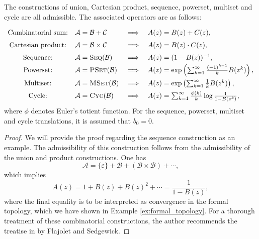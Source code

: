 \begin{theorem}\label{thm:symbolic_method}
  The constructions of union, Cartesian product, sequence, powerset, multiset and cycle are all admissible. The associated operators are as follows:
  \begin{equation*}
    \def\arraystretch{1.5}
    \begin{array}{cllll}
      \text{Combinatorial sum:} & \mathcal{A} = \mathcal{B} + \mathcal{C} & \implies & A(z) = B(z) + C(z), \\
      \text{Cartesian product:} & \mathcal{A} = \mathcal{B} \times \mathcal{C} & \implies & A(z) = B(z) \cdot C(z), \\
      \text{Sequence:} & \mathcal{A} = \textsc{Seq}(\mathcal{B}) & \implies & A(z) = (1 - B(z))^{-1}, \\
      \text{Powerset:} & \mathcal{A} = \textsc{PSet}(\mathcal{B}) & \implies & A(z) = \exp\left(\sum_{k=1}^\infty \frac{(-1)^{k-1}}{k}B(z^k)\right), \\
      \text{Multiset:} & \mathcal{A} = \textsc{MSet}(\mathcal{B}) & \implies & A(z) = \exp\left(\sum_{k=1}^\infty \frac{1}{k} B(z^k)\right), \\
      \text{Cycle:} & \mathcal{A} = \textsc{Cyc}(\mathcal{B}) & \implies & A(z) = \sum_{k=1}^\infty \frac{\phi(k)}{k} \log \frac{1}{1 - B(z^k)},
    \end{array}
  \end{equation*}
  where $\phi$ denotes Euler's totient function.
  For the sequence, powerset, multiset and cycle translations, it is assumed that $b_0 = 0$.
\end{theorem}

\begin{proof}
  We will provide the proof regarding the sequence construction as an example. The admissibility of this construction follows from the admissibility of the union and product constructions. One has
  $$
    \mathcal{A} = \{\varepsilon\} + \mathcal{B} + (\mathcal{B} \times \mathcal{B}) + \cdots,
  $$
  which implies
  $$
    A(z) = 1 + B(z) + B(z)^2 + \cdots = \frac{1}{1 - B(z)},
  $$
  where the final equality is to be interpreted as convergence in the formal topology, which we have shown in Example \ref{ex:formal_topology}.
  For a thorough treatment of these combinatorial constructions, the author recommends the treatise in \cite[Section I.2]{AnalyticCombinatorics} by Flajolet and Sedgewick.
\end{proof}


